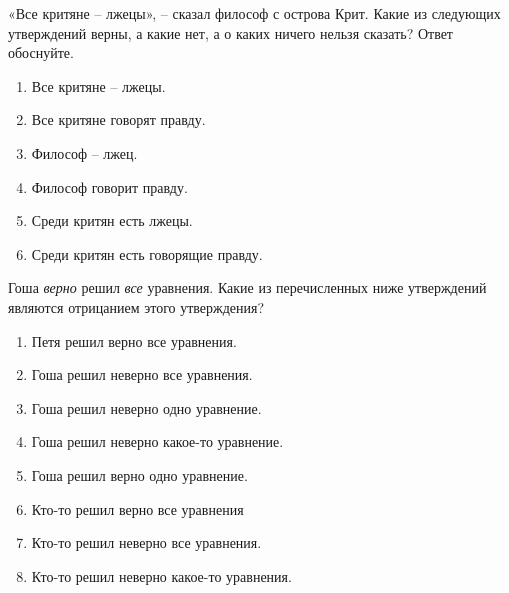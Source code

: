 

\begin{thm}
    «Все критяне – лжецы», – сказал философ с острова Крит. Какие из следующих утверждений верны, а какие нет, а о каких ничего нельзя сказать? Ответ обоснуйте.
    
    \begin{enumerate}[label=\asbuk*), ref=\asbuk*]
        \item Все критяне – лжецы.
        \item Все критяне говорят правду.
        \item Философ – лжец.
        \item Философ говорит правду.
        \item Среди критян есть лжецы.
        \item Среди критян есть говорящие правду.
    \end{enumerate}
    
\end{thm}


\begin{thm}
    Гоша \textit{верно} решил \textit{все} уравнения. Какие из перечисленных ниже утверждений являются отрицанием этого утверждения?
    
    \begin{enumerate}[label=\asbuk*), ref=\asbuk*]
        \item Петя решил верно все уравнения.
        \item Гоша решил неверно все уравнения.
        \item Гоша решил неверно одно уравнение.
        \item Гоша решил неверно какое-то уравнение.
        \item Гоша решил верно одно уравнение.
        \item Кто-то решил верно все уравнения
        \item Кто-то решил неверно все уравнения.
        \item Кто-то решил неверно какое-то уравнения.
    \end{enumerate}
    
\end{thm}


